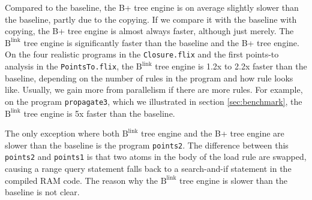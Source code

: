 \documentclass[twoside,11pt]{report}
\theoremstyle{definition}
\begin{document}
Compared to the baseline, the B+ tree engine is on average slightly slower than the baseline, partly due to the copying. If we compare it with the baseline with copying, the B+ tree engine is almost always faster, although just merely. The $\text{B}^{\text{link}}$ tree engine is significantly faster than the baseline and the B+ tree engine. On the four realistic programs in the \texttt{Closure.flix} and the first points-to analysis in the \texttt{PointsTo.flix}, the $\text{B}^{\text{link}}$ tree engine is 1.2x to 2.2x faster than the baseline, depending on the number of rules in the program and how rule looks like. Usually, we gain more from parallelism if there are more rules. For example, on the program \texttt{propagate3}, which we illustrated in section \ref{sec:benchmark}, the $\text{B}^{\text{link}}$ tree engine is 5x faster than the baseline.

The only exception where both $\text{B}^{\text{link}}$ tree engine and the B+ tree engine are slower than the baseline is the program \texttt{points2}. The difference between this \texttt{points2} and \texttt{points1} is that two atoms in the body of the load rule are swapped, causing a range query statement falls back to a search-and-if statement in the compiled RAM code. The reason why the $\text{B}^{\text{link}}$ tree engine is slower than the baseline is not clear.
\end{document}
